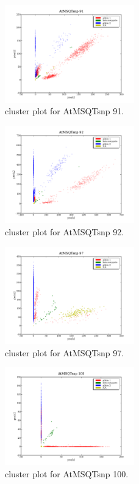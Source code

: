 \begin{figure}[H]
\includegraphics[width=0.5\textwidth]{figures/cluster_plot_AtMSQTsnp_91.png}
\caption{cluster plot for AtMSQTsnp 91.} \label{flAtMSQTsnp91}
\end{figure}
\begin{figure}[H]
\includegraphics[width=0.5\textwidth]{figures/cluster_plot_AtMSQTsnp_92.png}
\caption{cluster plot for AtMSQTsnp 92.} \label{flAtMSQTsnp92}
\end{figure}
\begin{figure}[H]
\includegraphics[width=0.5\textwidth]{figures/cluster_plot_AtMSQTsnp_97.png}
\caption{cluster plot for AtMSQTsnp 97.} \label{flAtMSQTsnp97}
\end{figure}
\begin{figure}[H]
\includegraphics[width=0.5\textwidth]{figures/cluster_plot_AtMSQTsnp_100.png}
\caption{cluster plot for AtMSQTsnp 100.} \label{flAtMSQTsnp100}
\end{figure}
